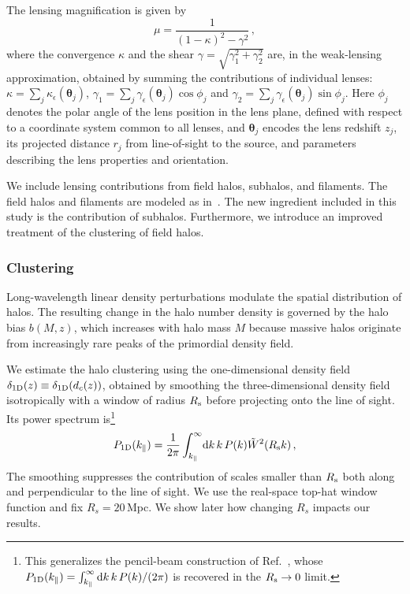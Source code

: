 \documentclass[aps,prd,10pt,nofootinbib,twocolumn,superscriptaddress,floatfix,notitlepage]{revtex4-1}
\newcommand{\td}{{\rm d}}
\newcommand{\vect}[1]{\boldsymbol{#1}}
\newcommand{\be}{\begin{equation}}
\newcommand{\ee}{\end{equation}}
\begin{document}
The lensing magnification is given by
\be \label{eq:mueq}
	\mu = \frac{1}{(1-\kappa)^2 - \gamma^2} \,,
\ee
where the convergence $\kappa$ and the shear $\gamma = \sqrt{\gamma_1^2+\gamma_2^2}$ are, in the weak-lensing approximation, obtained by summing the contributions of individual lenses: $\kappa = \sum_j \kappa_\epsilon(\vect\theta_j)$, $\gamma_1 = \sum_j \gamma_\epsilon(\vect\theta_j) \cos\phi_j$ and $\gamma_2 = \sum_j \gamma_\epsilon(\vect\theta_j) \sin\phi_j$. Here $\phi_j$ denotes the polar angle of the lens position in the lens plane, defined with respect to a coordinate system common to all lenses, and $\vect\theta_j$ encodes the lens redshift $z_j$, its projected distance $r_j$ from line-of-sight to the source, and parameters describing the lens properties and orientation.

We include lensing contributions from field halos, subhalos, and filaments. The field halos and filaments are modeled as in~\cite{Vaskonen:2026ubd}. The new ingredient included in this study is the contribution of subhalos. Furthermore, we introduce an improved treatment of the clustering of field halos.

\subsubsection{Clustering}

Long-wavelength linear density perturbations modulate the spatial distribution of halos. The resulting change in the halo number density is governed by the halo bias $b(M,z)$, which increases with halo mass $M$ because massive halos originate from increasingly rare peaks of the primordial density field.

We estimate the halo clustering using the one-dimensional density field $\delta_{\rm 1D}(z) \equiv \delta_{\rm 1D}(d_c(z))$, obtained by smoothing the three-dimensional density field isotropically with a window of radius $R_{\rm s}$ before projecting onto the line of sight. Its power spectrum is\footnote{This generalizes the pencil-beam construction of Ref.~\cite{1991ApJ...379..482K}, whose $P_{\rm 1D}(k_\parallel)=\int_{k_\parallel}^\infty \td k\,k\,P(k)/(2\pi)$ is recovered in the $R_{\rm s}\to0$ limit.}
\be
    P_{\rm 1D}(k_\parallel) = \frac{1}{2\pi} \int_{k_\parallel}^\infty \!\td k \, k \, P(k) \tilde{W}^2(R_{\rm s} k) \,,
\ee
The smoothing suppresses the contribution of scales smaller than $R_{\rm s}$ both along and perpendicular to the line of sight. We use the real-space top-hat window function and fix $R_s = 20\,$Mpc. We show later how changing $R_s$ impacts our results. 
\end{document}

